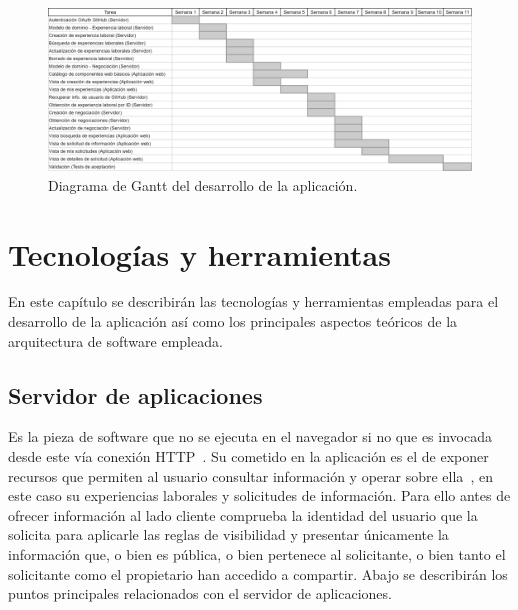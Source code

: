 \documentclass[a4paper, 12pt]{book}
\begin{document}
    \begin{figure}
        \centering
        \includegraphics[width=15cm, keepaspectratio]{img/Gantt.png}
        \caption{Diagrama de Gantt del desarrollo de la aplicación.}\label{figure:gantt}
    \end{figure}



    \cleardoublepage


    \chapter{Tecnologías y herramientas}
    \label{chap:estado}
    En este capítulo se describirán las tecnologías y herramientas empleadas para el desarrollo de la aplicación
    así como los principales aspectos teóricos de la arquitectura de software empleada.


    \section{Servidor de aplicaciones}
    \label{sec:intro_applicationserver}

    Es la pieza de software que no se ejecuta en el navegador si no que es invocada desde este vía conexión HTTP~\cite{bib:http}.
    Su cometido en la aplicación es el de exponer recursos que permiten al usuario consultar información y operar sobre ella~\cite{bib:appserver}, en este caso su experiencias laborales y solicitudes de información.
    Para ello antes de ofrecer información al lado cliente comprueba la identidad del usuario que la solicita para aplicarle las reglas de visibilidad y presentar únicamente la información que,
    o bien es pública, o bien pertenece al solicitante, o bien tanto el solicitante como el propietario han accedido a compartir. Abajo se describirán los puntos principales relacionados con el servidor de aplicaciones.
\end{document}
